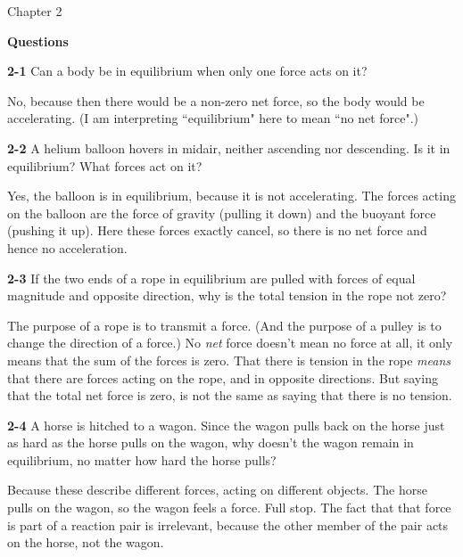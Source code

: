 \documentclass{amsart}
\begin{document}
Chapter 2

\textbf{Questions}

\vspace{\baselineskip}

\noindent
\textbf{2-1} Can a body be in equilibrium when only one force acts on it?

No, because then there would be a non-zero net force, so the body would be accelerating.
(I am interpreting ``equilibrium" here to mean ``no net force".)

\vspace{\baselineskip}

\noindent
\textbf{2-2} A helium balloon hovers in midair, neither ascending nor descending.
Is it in equilibrium?
What forces act on it?

Yes, the balloon is in equilibrium, because it is not accelerating.
The forces acting on the balloon are the force of gravity (pulling it down)
and the buoyant force (pushing it up).
Here these forces exactly cancel, so there is no net force and hence no acceleration.

\vspace{\baselineskip}

\noindent
\textbf{2-3} If the two ends of a rope in equilibrium are pulled with forces of equal magnitude
and opposite direction, why is the total tension in the rope not zero?

The purpose of a rope is to transmit a force.
(And the purpose of a pulley is to change the direction of a force.)
No \textit{net} force doesn't mean no force at all, it only means that the sum of the forces is zero.
That there is tension in the rope \textit{means} that there are forces acting on the rope,
and in opposite directions.
But saying that the total net force is zero, is not the same as saying that there is no tension.

\vspace{\baselineskip}

\noindent
\textbf{2-4} A horse is hitched to a wagon.
Since the wagon pulls back on the horse just as hard as the horse pulls on the wagon,
why doesn't the wagon remain in equilibrium, no matter how hard the horse pulls?

Because these describe different forces, acting on different objects.
The horse pulls on the wagon, so the wagon feels a force.  Full stop.
The fact that that force is part of a reaction pair is irrelevant,
because the other member of the pair acts on the horse, not the wagon.
\end{document}

